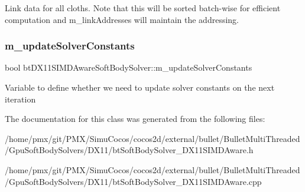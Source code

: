 Link data for all cloths. Note that this will be sorted batch-\/wise for efficient computation and m\+\_\+link\+Addresses will maintain the addressing. \mbox{\label{classbtDX11SIMDAwareSoftBodySolver_af027eb9f28bcc9069a003dd7867d0e0c}} 
\subsubsection{\texorpdfstring{m\+\_\+update\+Solver\+Constants}{m\_updateSolverConstants}}
{\footnotesize\ttfamily bool bt\+D\+X11\+S\+I\+M\+D\+Aware\+Soft\+Body\+Solver\+::m\+\_\+update\+Solver\+Constants\hspace{0.3cm}{\ttfamily [protected]}}

Variable to define whether we need to update solver constants on the next iteration 

The documentation for this class was generated from the following files\+:\begin{DoxyCompactItemize}
\item 
/home/pmx/git/\+P\+M\+X/\+Simu\+Cocos/cocos2d/external/bullet/\+Bullet\+Multi\+Threaded/\+Gpu\+Soft\+Body\+Solvers/\+D\+X11/bt\+Soft\+Body\+Solver\+\_\+\+D\+X11\+S\+I\+M\+D\+Aware.\+h\item 
/home/pmx/git/\+P\+M\+X/\+Simu\+Cocos/cocos2d/external/bullet/\+Bullet\+Multi\+Threaded/\+Gpu\+Soft\+Body\+Solvers/\+D\+X11/bt\+Soft\+Body\+Solver\+\_\+\+D\+X11\+S\+I\+M\+D\+Aware.\+cpp\end{DoxyCompactItemize}
